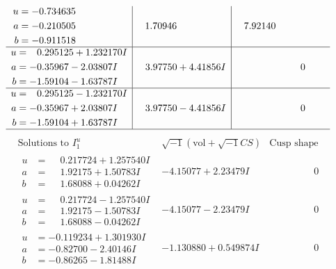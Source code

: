 \documentclass[1p]{elsarticle_modified}
\theoremstyle{definition}
\newcommand{\I}{\sqrt{-1}}
\begin{document}
$$\begin{array}{c|c|c}
\begin{aligned}
u &= -0.734635\phantom{ +0.000000I} \\
a &= -0.210505\phantom{ +0.000000I} \\
b &= -0.911518\phantom{ +0.000000I}\end{aligned}
 & \phantom{-}1.70946\phantom{ +0.000000I} & \phantom{-}7.92140\phantom{ +0.000000I} \\ \hline\begin{aligned}
u &= \phantom{-}0.295125 + 1.232170 I \\
a &= -0.35967 - 2.03807 I \\
b &= -1.59104 - 1.63787 I\end{aligned}
 & \phantom{-}3.97750 + 4.41856 I & \phantom{-0.000000 } 0 \\ \hline\begin{aligned}
u &= \phantom{-}0.295125 - 1.232170 I \\
a &= -0.35967 + 2.03807 I \\
b &= -1.59104 + 1.63787 I\end{aligned}
 & \phantom{-}3.97750 - 4.41856 I & \phantom{-0.000000 } 0\\
 \hline 
 \end{array}$$\newpage$$\begin{array}{c|c|c}  
\text{Solutions to }I^u_{1}& \I (\text{vol} + \sqrt{-1}CS) & \text{Cusp shape}\\
 \hline 
\begin{aligned}
u &= \phantom{-}0.217724 + 1.257540 I \\
a &= \phantom{-}1.92175 + 1.50783 I \\
b &= \phantom{-}1.68088 + 0.04262 I\end{aligned}
 & -4.15077 + 2.23479 I & \phantom{-0.000000 } 0 \\ \hline\begin{aligned}
u &= \phantom{-}0.217724 - 1.257540 I \\
a &= \phantom{-}1.92175 - 1.50783 I \\
b &= \phantom{-}1.68088 - 0.04262 I\end{aligned}
 & -4.15077 - 2.23479 I & \phantom{-0.000000 } 0 \\ \hline\begin{aligned}
u &= -0.119234 + 1.301930 I \\
a &= -0.82700 - 2.40146 I \\
b &= -0.86265 - 1.81488 I\end{aligned}
 & -1.130880 + 0.549874 I & \phantom{-0.000000 } 0 \\ \hline\begin{aligned}

\end{aligned}
\end{array}$$
\end{document}
